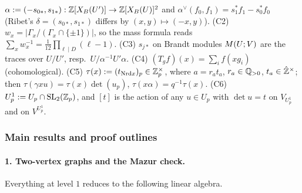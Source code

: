 \begin{itemize}
  $\alpha:=(-s_{0*},s_{1*}):\mathbb{Z}[X_B(U')]\to\mathbb{Z}[X_B(U)]^2$ and $\alpha^\vee(f_0,f_1)=s_1^*f_1-s_0^*f_0$ (Ribet's
  $\delta=(s_{0*},s_{1*})$ differs by $(x,y)\mapsto(-x,y)$). (C2) $w_x=|\Gamma_x/(\Gamma_x\cap\{\pm1\})|$, so the mass formula reads
  $\sum_xw_x^{-1}=\frac1{12}\prod_{\ell\mid D}(\ell-1)$. (C3) $s_{j*}$ on Brandt modules $M(U;V)$ are the traces over $U/U'$, resp.\
  $U/\alpha^{-1}U'\alpha$. (C4) $(T_gf)(x)=\sum_if(xg_i)$ (cohomological). (C5) $\tau(x):=(t_{\mathrm{Nrd} x})_p\in\mathbb{Z}_p^\times$, where
  $a=r_at_a$, $r_a\in\mathbb{Q}_{>0}$, $t_a\in\hat{\mathbb{Z}}^\times$; then $\tau(\gamma xu)=\tau(x)\det(u_p)$, $\tau(x\alpha)=q^{-1}\tau(x)$.
  (C6) $U^1_p:=U_p\cap\mathrm{SL}_2(\mathbb{Z}_p)$, and $[t]$ is the action of any $u\in U_p$ with $\det u=t$ on $V_{U^1_p}$ and on $V^{U^1_p}$.
\end{itemize}

\subsubsection*{Main results and proof outlines}

\paragraph{1. Two-vertex graphs and the Mazur check.} Everything at level $1$ reduces to the following linear algebra.

